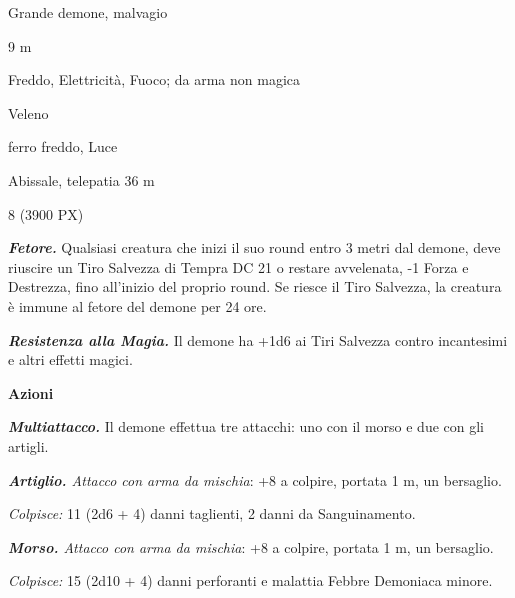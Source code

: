 \begin{multicols}{2}
{
\begin{description}[noitemsep, topsep=0pt, parsep=0pt, partopsep=0pt, itemsep=1pt, leftmargin=2.35cm,  labelwidth=2.2cm, itemindent=0cm, listparindent=0pt] %
\setlength{\baselineskip}{10pt}
\item[\textbf{Taglia/Tipo}] Grande demone, malvagio
\item[\textbf{Caratt.}] 
\item[\textbf{Punti Ferita}] 
\item[\textbf{Movimento}] 9 m
\item[\textbf{Tiri Salvez.}] 
\item[\textbf{Res. Danni}] Freddo, Elettricità, Fuoco; da arma non magica
\item[\textbf{Imm. Danni}] Veleno
\item[\textbf{Vulnerabilità}] ferro freddo, Luce
\item[\textbf{Sensi}] 
\item[\textbf{Linguaggi}] Abissale, telepatia 36 m
\item[\textbf{Sfida}] 8 (3900 PX)
\end{description}
\smallskip

\emph{\textbf{Fetore.}} Qualsiasi creatura che inizi il suo round entro 3 metri dal demone, deve riuscire un Tiro Salvezza di Tempra DC 21 o restare avvelenata, -1 Forza e Destrezza, fino all'inizio del proprio round. Se riesce il Tiro Salvezza, la creatura è immune al fetore del demone per 24 ore.

\emph{\textbf{Resistenza alla Magia.}} Il demone ha +1d6 ai Tiri Salvezza contro incantesimi e altri effetti magici.

\textbf{Azioni}

\emph{\textbf{Multiattacco.}} Il demone effettua tre attacchi: uno con il morso e due con gli artigli.

\emph{\textbf{Artiglio.} Attacco con arma da mischia}: +8 a colpire, portata 1 m, un bersaglio.

\emph{Colpisce:} 11 (2d6 + 4) danni taglienti, 2 danni da Sanguinamento.

\emph{\textbf{Morso.} Attacco con arma da mischia}: +8 a colpire, portata 1 m, un bersaglio.

\emph{Colpisce:} 15 (2d10 + 4) danni perforanti e malattia Febbre Demoniaca minore.

}
\end{multicols}
